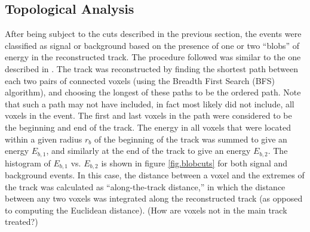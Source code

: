 \documentclass{JINST}
\begin{document}
\subsection{Topological Analysis}\label{ssec:TopologicalAnalysis}
After being subject to the cuts described in the previous section, the events were classified as signal or background based on the presence of one or two ``blobs'' of energy in the
reconstructed track.  The procedure followed was similar to the one described in \cite{NEXT_topology}.  The track was reconstructed by finding the shortest path between each two 
pairs of connected voxels (using the Breadth First Search (BFS) algorithm), and choosing the longest of these paths to be the ordered path.  Note that such a path may not have included, 
in fact most likely did not include, all voxels in the event.  The first and last voxels in the path
were considered to be the beginning and end of the track.  The energy in all voxels that were located within a given radius $r_b$ of the beginning of the track was summed to give
an energy $E_{b,1}$, and similarly at the end of the track to give an energy $E_{b,2}$.  The histogram of $E_{b,1}$ vs. $E_{b,2}$ is shown in figure \ref{fig.blobcuts} for both signal and
background events.  In this case, the distance between a voxel and the extremes of the track was calculated as 
``along-the-track distance,'' in which the distance between any two voxels was integrated along the reconstructed track (as opposed to computing the Euclidean distance).  (How are voxels
not in the main track treated?)
\end{document}
